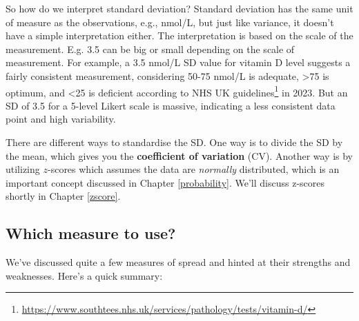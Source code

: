 \documentclass[
  11pt,
]{book}
\theoremstyle{indenteddefinition}
\theoremstyle{indenteddefinition}
\theoremstyle{definition}
\theoremstyle{definition}
\theoremstyle{remark}
\begin{document}
So how do we interpret standard deviation? Standard deviation has the same unit of measure as the observations, e.g., nmol/L, but just like variance, it doesn't have a simple interpretation either. The interpretation is based on the scale of the measurement. E.g. 3.5 can be big or small depending on the scale of measurement. For example, a 3.5 nmol/L SD value for vitamin D level suggests a fairly consistent measurement, considering 50-75 nmol/L is adequate, \textgreater75 is optimum, and \textless25 is deficient according to NHS UK guidelines\footnote{\url{https://www.southtees.nhs.uk/services/pathology/tests/vitamin-d/}} in 2023. But an SD of 3.5 for a 5-level Likert scale is massive, indicating a less consistent data point and high variability.

There are different ways to standardise the SD. One way is to divide the SD by the mean, which gives you the \textbf{coefficient of variation} (CV). Another way is by utilizing \(z\)-scores which assumes the data are \emph{normally} distributed, which is an important concept discussed in Chapter \ref{probability}. We'll discuss z-scores shortly in Chapter \ref{zscore}.

\hypertarget{which-measure-to-use}{%
\subsection{Which measure to use?}\label{which-measure-to-use}}

We've discussed quite a few measures of spread and hinted at their strengths and weaknesses. Here's a quick summary:
\end{document}
